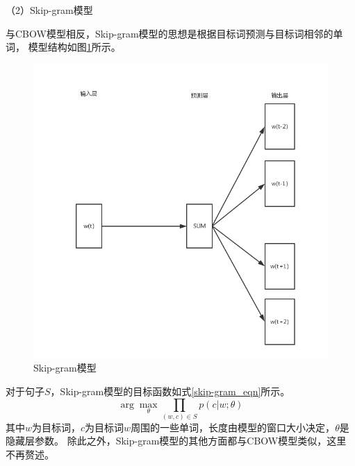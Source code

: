 （2）Skip-gram模型

与CBOW模型相反，Skip-gram模型的思想是根据目标词预测与目标词相邻的单词，
模型结构如图\ref{skip-gram}所示。
\begin{figure}[h]
    \includegraphics[scale=0.6]{picture/skip-gram.png}
    \caption{Skip-gram模型}
    \label{skip-gram}
\end{figure}
对于句子$S$，Skip-gram模型的目标函数如式\ref{skip-gram_eqn}所示。
\begin{equation}
    \arg \max_{\theta } \prod_{\left ( w,c \right )\in S}p\left ( c|w;\theta \right )
    \label{skip-gram_eqn}
\end{equation}
其中$w$为目标词，$c$为目标词$w$周围的一些单词，长度由模型的窗口大小决定，$\theta$是隐藏层参数。
除此之外，Skip-gram模型的其他方面都与CBOW模型类似，这里不再赘述。


